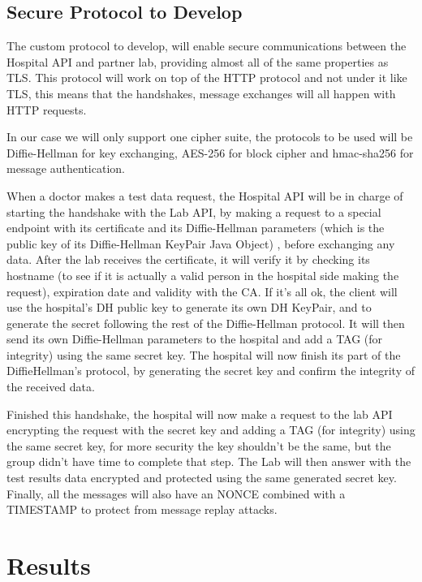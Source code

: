 \subsection{Secure Protocol to Develop}
The custom protocol to develop, will enable secure communications between the Hospital API and partner lab, providing almost all of the same properties as TLS.
This protocol will work on top of the HTTP protocol and not under it like TLS, this means that the handshakes, message exchanges will all happen with HTTP requests.

In our case we will only support one cipher suite, the protocols to be used will be Diffie-Hellman\cite{diffiehellman} for key exchanging, AES-256 for block cipher and hmac-sha256 for message authentication.

When a doctor makes a test data request, the Hospital API will be in charge of starting the handshake with the Lab API, by making a request to a special endpoint with its certificate and its Diffie-Hellman parameters (which is the public key of its Diffie-Hellman KeyPair Java Object) , before exchanging any data.  After the lab receives the certificate, it will verify it by checking its hostname (to see if it is actually a valid person in the hospital side making the request), expiration date and validity with the CA. If it's all ok, the client will use the hospital's DH public key to generate its own DH KeyPair, and to generate the secret following the rest of the Diffie-Hellman protocol. It will then send its own Diffie-Hellman parameters to the hospital and add a TAG (for integrity) using the same secret key. The hospital will now finish its part of the DiffieHellman's protocol, by generating the secret key and confirm the integrity of the received data.

Finished this handshake, the hospital will now make a request to the lab API encrypting the request with the secret key and adding a TAG (for integrity) using the same secret key, for more security the key shouldn't be the same, but the group didn't have time to complete that step. The Lab will then answer with the test results data encrypted and protected using the same generated secret key. Finally, all the messages will also have an NONCE combined with a TIMESTAMP to protect from message replay attacks. \\


\section{Results}

